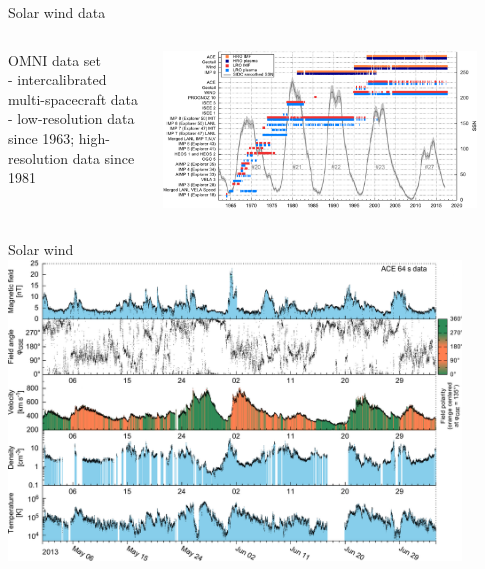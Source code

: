 \begin{frame}[plain,c]{Solar wind data}{}
	\begin{columns}[c]
	\column{\textwidth}
		
		OMNI data set \citep{King2005}\\
		- intercalibrated multi-spacecraft data\\
		- low-resolution data since 1963; high-resolution data since 1981\\\ 
		
		\centering
		\includegraphics[width=0.9\textwidth]{../figures_of_mine/gnuplots/timeline_OMNI_SC_IDs.pdf}
		
		
	\end{columns}
\end{frame}
\begin{frame}[plain,c]{Solar wind}{}
	\centering
	\includegraphics[width=0.9\textwidth]{../talk_figures/sw_ace_plot_wo_marks.png}
	
\end{frame}
